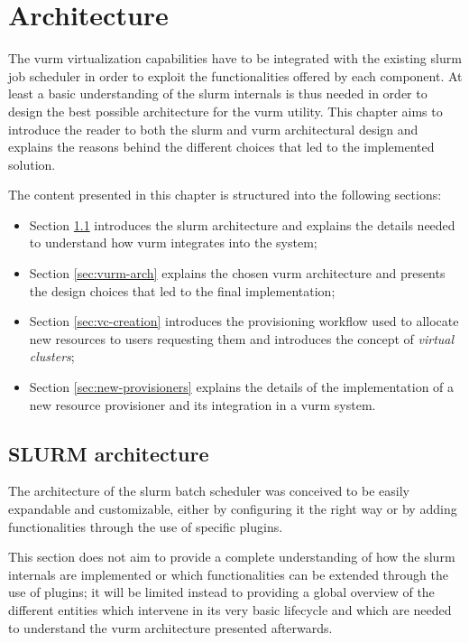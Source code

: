 \chapter{Architecture}
\label{sec:architecture}

The \gls{vurm} virtualization capabilities have to be integrated with the existing \gls{slurm} job scheduler in order to exploit the functionalities offered by each component. At least a basic understanding of the \gls{slurm} internals is thus needed in order to design the best possible architecture for the \gls{vurm} utility. This chapter aims to introduce the reader to both the \gls{slurm} and \gls{vurm} architectural design and explains the reasons behind the different choices that led to the implemented solution.

The content presented in this chapter is structured into the following sections:

\begin{itemize}
	\item Section \ref{sec:slurm-arch} introduces the \gls{slurm} architecture and explains the details needed to understand how \gls{vurm} integrates into the system;
	\item Section \ref{sec:vurm-arch} explains the chosen \gls{vurm} architecture and presents the design choices that led to the final implementation;
	\item Section \ref{sec:vc-creation} introduces the provisioning workflow used to allocate new resources to users requesting them and introduces the concept of \emph{virtual clusters};
	\item Section \ref{sec:new-provisioners} explains the details of the implementation of a new resource provisioner and its integration in a \gls{vurm} system.
\end{itemize}



\section{SLURM architecture}
\label{sec:slurm-arch}

The architecture of the \gls{slurm} batch scheduler was conceived to be easily expandable and customizable, either by configuring it the right way or by adding functionalities through the use of specific plugins.

This section does not aim to provide a complete understanding of how the \gls{slurm} internals are implemented or which functionalities can be extended through the use of plugins; it will be limited instead to providing a global overview of the different entities which intervene in its very basic lifecycle and which are needed to understand the \gls{vurm} architecture presented afterwards.


